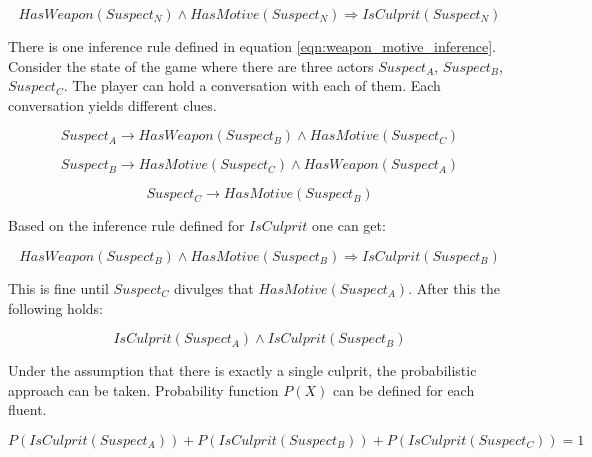 \begin{equation}
    \label{eqn:weapon_motive_inference}
    HasWeapon \left( Suspect_N \right) \land HasMotive \left( Suspect_N \right) \Rightarrow  IsCulprit \left( Suspect_N \right)
\end{equation}

There is one inference rule defined in equation \ref{eqn:weapon_motive_inference}.
Consider the state of the game where there are three actors $Suspect_A$, $Suspect_B$, $Suspect_C$.
The player can hold a conversation with each of them.
Each conversation yields different clues.

\begin{equation}
    Suspect_A \rightarrow HasWeapon \left( Suspect_B \right) \land HasMotive \left( Suspect_C \right)
\end{equation}

\begin{equation}
    Suspect_B \rightarrow HasMotive \left( Suspect_C \right) \land HasWeapon \left( Suspect_A \right)
\end{equation}

\begin{equation}
    Suspect_C \rightarrow HasMotive \left( Suspect_B \right)
\end{equation}

Based on the inference rule defined for $IsCulprit$ one can get:

\begin{equation}
    HasWeapon \left( Suspect_B \right) \land HasMotive \left( Suspect_B \right) \Rightarrow  IsCulprit \left( Suspect_B \right)
\end{equation}

This is fine until $Suspect_C$ divulges that $HasMotive \left( Suspect_A \right)$.
After this the following holds:

\begin{equation}
    IsCulprit \left( Suspect_A \right) \land IsCulprit \left( Suspect_B \right)
\end{equation}

Under the assumption that there is exactly a single culprit, the probabilistic approach can be taken.
Probability function $P(X)$ can be defined for each fluent.

\begin{equation}
    \label{eqn:is_culprit_probability_pre}
    P \left( IsCulprit \left( Suspect_A \right) \right) + P \left( IsCulprit \left( Suspect_B \right) \right) + P \left( IsCulprit \left( Suspect_C \right) \right) = 1
\end{equation}

